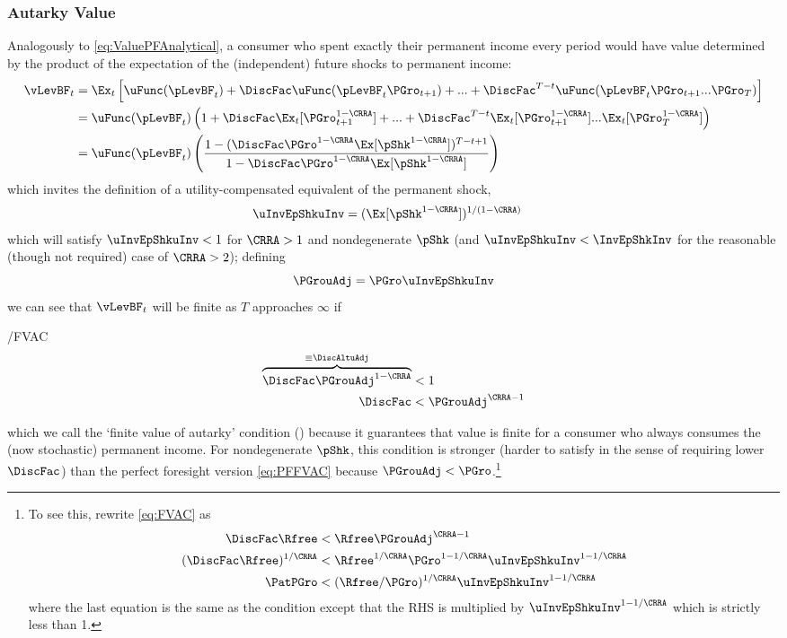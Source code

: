 \documentclass[BufferStockTheory]{subfiles}
\begin{document}
\subsubsection{Autarky Value}
Analogously to \eqref{eq:ValuePFAnalytical}, a consumer who spent exactly their permanent income every period would have value determined by the product of the expectation of the (independent) future shocks to permanent income:
\begin{align*}
  \vLevBF_{t}  & = \Ex_{t}\left[\uFunc(\pLevBF_{t}) + \DiscFac \uFunc(\pLevBF_{t}\PGro_{t+1}) + ... + \DiscFac^{T-t}\uFunc(\pLevBF_{t}\PGro_{t+1}...\PGro_{T})\right] \\
               & = \uFunc(\pLevBF_{t})\left(1+ \DiscFac \Ex_{t}[\PGro_{t+1}^{1-\CRRA}] +  ... + \DiscFac^{T-t}\Ex_{t}[\PGro_{t+1}^{1-\CRRA}]...\Ex_{t}[\PGro_{T}^{1-\CRRA}]\right) \\
               & = \uFunc(\pLevBF_{t})\left(\frac{1-(\DiscFac \PGro^{1-\CRRA}\Ex[\pShk^{1-\CRRA}])^{T-t+1}}{1-\DiscFac \PGro^{1-\CRRA} \Ex[\pShk^{1-\CRRA}]}\right)
\end{align*}
which invites the definition of a utility-compensated equivalent of the permanent shock,
\begin{align*}
  \uInvEpShkuInv  & = (\Ex[\pShk^{1-\CRRA}])^{1/(1-\CRRA)}
\end{align*}
which will satisfy $\uInvEpShkuInv < 1$ for $\CRRA>1$ and nondegenerate $\pShk$ (and $\uInvEpShkuInv < \InvEpShkInv$ for the reasonable (though not required) case of $\CRRA > 2$); defining
\begin{equation}
  \label{eq:PGrouAdj}
 \PGrouAdj = \PGro \uInvEpShkuInv 
\end{equation}
we can see that $\vLevBF_{t}$ will be finite as $T$ approaches $\infty$ if
\hypertarget{FVAC}{}
\begin{verbatimwrite}{\EqDir/FVAC}
  \begin{align}
    \overbrace{\DiscFac \PGrouAdj^{1-\CRRA} }^{\equiv \DiscAltuAdj}  & < 1 \label{eq:FVAC}
    \\ \DiscFac  & < \PGrouAdj^{\CRRA-1} \notag
  \end{align}
\end{verbatimwrite}
 which we call the `finite value of autarky'
condition (\FVAC) because it guarantees that value is finite for a consumer who always consumes the 
(now stochastic) permanent income.  For nondegenerate $\pShk$, this 
condition is stronger
(harder to satisfy in the sense of requiring lower $\DiscFac$) than
the perfect foresight version \eqref{eq:PFFVAC} because $\PGrouAdj <
\PGro$.\footnote{To see this, rewrite \eqref{eq:FVAC} as 
\begin{align*}
  \DiscFac \Rfree & < \Rfree \PGrouAdj^{\CRRA-1}
  \\ (\DiscFac \Rfree)^{1/\CRRA}  & < \Rfree^{1/\CRRA} \PGro^{1-1/\CRRA} \uInvEpShkuInv^{1-1/\CRRA}
  \\ \PatPGro & < (\Rfree/\PGro)^{1/\CRRA} \uInvEpShkuInv^{1-1/\CRRA}
\end{align*}
where the last equation is the same as the {\PFFVAC} condition except that the 
RHS is multiplied by $\uInvEpShkuInv^{1-1/\CRRA}$ which is strictly less than 1.}
\end{document}
